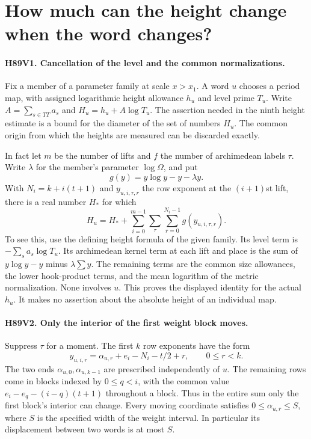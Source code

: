 \section{How much can the height change when the word changes?}

\paragraph{H89V1. Cancellation of the level and the common normalizations.}
Fix a member of a parameter family at scale $x>x_1$. A word $u$
chooses a period map, with assigned logarithmic height allowance $h_u$
and level prime $T_u$. Write $A=\sum_{s\in TT}a_s$ and
$H_u=h_u+A\log T_u$. The assertion needed in the ninth height
estimate is a bound for the diameter of the set of numbers $H_u$.
The common origin from which the heights are measured can be
discarded exactly.

In fact let $m$ be the number of lifts and $f$ the number of
archimedean labels $\tau$. Write $\lambda$ for the member's
parameter $\log\Omega$, and put
\[
  g(y)=y\log y-y-\lambda y .
\]
With $N_i=k+i(t+1)$ and $y_{u,i,\tau,r}$ the row exponent at
the $(i+1)$st lift, there is a real number $H_*$ for which
\[
 H_u=H_*+\sum_{i=0}^{m-1}\sum_\tau
                \sum_{r=0}^{N_i-1}g(y_{u,i,\tau,r}).
\]
To see this, use the defining height formula of the given family.
Its level term is $-\sum_s a_s\log T_u$. Its archimedean kernel
term at each lift and place is the sum of $y\log y-y$ minus
$\lambda\sum y$. The remaining terms are the common size allowances,
the lower hook-product terms, and the mean logarithm of the metric
normalization. None involves $u$. This proves the displayed
identity for the actual $h_u$. It makes no assertion about the
absolute height of an individual map.

\paragraph{H89V2. Only the interior of the first weight block moves.}
Suppress $\tau$ for a moment. The first $k$ row exponents have
the form
\[
 y_{u,i,r}=\alpha_{u,r}+e_i-N_i-t/2+r,\qquad 0\le r<k .
\]
The two ends $\alpha_{u,0},\alpha_{u,k-1}$ are prescribed
independently of $u$. The remaining rows come in blocks indexed
by $0\le q<i$, with the common value $e_i-e_q-(i-q)(t+1)$
throughout a block. Thus in the entire sum only the first block's
interior can change. Every moving coordinate satisfies
$0\le\alpha_{u,r}\le S$, where $S$ is the specified width of
the weight interval. In particular its displacement between two
words is at most $S$.

